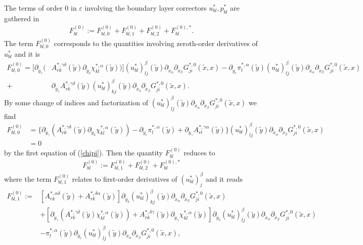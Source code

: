 \documentclass[11pt, reqno]{amsart}
\theoremstyle{definition}
\theoremstyle{remark}
\numberwithin{equation}{section}
\begin{document}
	\noindent The terms of order 0 in $\varepsilon$ involving the boundary layer correctors
	$u^*_{bl},p^*_{bl} $  are gathered in
	\begin{align*}
		F^{(0)}_{bl}:=	F^{(0)}_{bl,0} + F^{(0)}_{bl,1}+ F^{(0)}_{bl,2}+F^{(0),*}_{bl}.
	\end{align*}
	The term $F^{(0)}_{bl,0}$ corresponds to the quantities involving zeroth-order derivatives of  $u^*_{bl}$ and it is 
	\begin{align*}
		F^{(0)}_{bl,0}=	[	\partial_{\tilde{y}_\gamma} (& A^{*,\gamma\delta}_{rk}(\tilde{y})\partial_{\tilde{y}_\delta} \chi^{*,\alpha}_{kl}(\tilde{y}))](u^*_{bl})^{\beta}_{lj}	(\tilde{y})\partial_{ \tilde{x}_{\alpha}}\partial_{\tilde{x}_{\beta}} G_{ji}^{*,0}  (\tilde{x},x) -  \partial_{\tilde{y}_r}	\pi^{*,\alpha}_{l}(\tilde{y})(u^*_{bl})^{\beta}_{lj}	(\tilde{y})\partial_{\tilde{x}_\alpha}\partial_{\tilde{x}_{\beta}} G_{ji}^{*,0} (\tilde{x},x)   \\
		+	&	\partial_{\tilde{y}_\gamma}  A^{*,\gamma\delta}_{rk}(\tilde{y}) (u^*_{bl})^{\beta}_{kj}(\tilde{y})\partial_{\tilde{x}_\delta}\partial_{\tilde{x}_{\beta}} G_{ji}^{*,0} (\tilde{x},x).
	\end{align*}
	By some change of indices and factorization of $(u^*_{bl})^{\beta}_{lj}(\tilde{y})\partial_{\tilde{x}_\alpha}\partial_{\tilde{x}_{\beta}} G_{ji}^{*,0} (\tilde{x},x)$ we find
	\begin{align*}
		F^{(0)}_{bl,0}
		&= \{	\partial_{\tilde{y}_\gamma} ( A^{*,\gamma\delta}_{rk}(\tilde{y})\partial_{\tilde{y}_\delta} \chi^{*,\alpha}_{kl}(\tilde{y})) -  \partial_{\tilde{y}_r}	\pi^{*,\alpha}_{l}(\tilde{y})	
		+	\partial_{\tilde{y}_\gamma}  A^{*,\gamma\alpha}_{rl}(\tilde{y})\} (u^*_{bl})^{\beta}_{lj}(\tilde{y})\partial_{\tilde{x}_\alpha}\partial_{\tilde{x}_{\beta}} G_{ji}^{*,0} (\tilde{x},x)\\
		&=0
	\end{align*}
	by the first equation of (\ref{chipi}).
	\noindent Then the quantity $F^{(0)}_{bl}$ reduces to 
	\begin{align}\label{F0bl}
		F^{(0)}_{bl}:= F^{(0)}_{bl,1}+ F^{(0)}_{bl,2}+F^{(0),*}_{bl}	
	\end{align}
	where the term $F^{(0)}_{bl,1}$ relates to first-order derivatives of  $(u^*_{bl})^{\beta}_{j}$ and it reads
	\begin{align*}
		F^{(0)}_{bl,1}	:=	&	[  A^{*,\alpha\delta}_{rk}(\tilde{y})+	  A^{*,\delta\alpha}_{rk}(\tilde{y})]\partial_{\tilde{y}_\delta} (u^*_{bl})^{\beta}_{kj}(\tilde{y})\partial_{\tilde{x}_\alpha}\partial_{\tilde{x}_{\beta}} G_{ji}^{*,0} (\tilde{x},x)\nonumber\\
		& +[	\partial_{\tilde{y}_\gamma} ( A^{*,\gamma\delta}_{rk}(\tilde{y}) \chi^{*,\alpha}_{kl}(\tilde{y})) + A^{*,\delta\gamma}_{rk}(\tilde{y})\partial_{\tilde{y}_\gamma} \chi^{*,\alpha}_{kl}(\tilde{y})]	\partial_{\tilde{y}_\delta}(u^*_{bl})^{\beta}_{lj}	(\tilde{y})\partial_{ \tilde{x}_{\alpha}}\partial_{\tilde{x}_{\beta}} G_{ji}^{*,0}  (\tilde{x},x)\nonumber \\
		&-  	\pi^{*,\alpha}_{l}(\tilde{y})	\partial_{\tilde{y}_r} (u^*_{bl})^{\beta}_{lj}(\tilde{y}) \partial_{ \tilde{x}_{\alpha}}\partial_{\tilde{x}_{\beta}}G_{ji}^{*,0} (\tilde{x},x),
	\end{align*}
\end{document}
